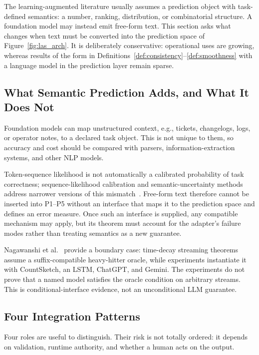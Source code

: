 \documentclass[acmsmall,screen,nonacm]{acmart}
\theoremstyle{acmdefinition}%
\begin{document}
The learning-augmented literature usually assumes a prediction object with task-defined semantics: a number, ranking, distribution, or combinatorial structure. A foundation model may instead emit free-form text. This section asks what changes when text must be converted into the prediction space of Figure~\ref{fig:las_arch}. It is deliberately conservative: operational uses are growing, whereas results of the form in Definitions~\ref{def:consistency}--\ref{def:smoothness} with a language model in the prediction layer remain sparse.

\subsection{What Semantic Prediction Adds, and What It Does Not}
\label{subsec:semantic}

Foundation models can map unstructured context, e.g., tickets, changelogs, logs, or operator notes, to a declared task object. This is not unique to them, so accuracy and cost should be compared with parsers, information-extraction systems, and other NLP models.

Token-sequence likelihood is not automatically a calibrated probability of task correctness; sequence-likelihood calibration and semantic-uncertainty methods address narrower versions of this mismatch~\cite{zhao2023slic,farquhar2024semantic}. Free-form text therefore cannot be inserted into P1--P5 without an interface that maps it to the prediction space and defines an error measure. Once such an interface is supplied, any compatible mechanism may apply, but its theorem must account for the adapter's failure modes rather than treating semantics as a new guarantee.

Nagawanshi et al.~\cite{nagawanshi2026moment} provide a boundary case: time-decay streaming theorems assume a suffix-compatible heavy-hitter oracle, while experiments instantiate it with CountSketch, an LSTM, ChatGPT, and Gemini. The experiments do not prove that a named model satisfies the oracle condition on arbitrary streams. This is conditional-interface evidence, not an unconditional LLM guarantee.

\subsection{Four Integration Patterns}
\label{subsec:llm_patterns}

Four roles are useful to distinguish. Their risk is not totally ordered: it depends on validation, runtime authority, and whether a human acts on the output.
\end{document}
